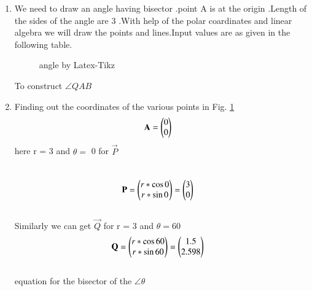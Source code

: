 \begin{enumerate}[label=\thesection.\arabic*.,ref=\thesection.\theenumi]
\item We need to draw  an angle having   bisector .point A is at the origin .Length of the  sides of the angle are 3 .With help of the polar coardinates and linear algebra we will draw the points and lines.Input values are as given in the following table.

\begin{figure}[!ht]
\centering
\resizebox{\columnwidth}{!}{}
\caption{ angle by Latex-Tikz}
\label{fig:angle}	
\end{figure}

\begin{table}[ht!]
\centering

\caption{To construct $\angle QAB$}
\label{table:table1}	
\end{table}


\item Finding out  the coordinates of the various points in Fig. \ref{fig:angle}
\label{const:angle}
\\
 
\begin{align}
\mathbf{A} &= \begin{pmatrix}0\\0\end{pmatrix}
\end{align}
here r = 3 and $\theta =$ 0 for  $\vec{P}$


\begin{align}
\\
\mathbf{P} &= \begin{pmatrix}r*\cos{0}\\r*\sin{0}\end{pmatrix} = \begin{pmatrix}3\\0\end{pmatrix}
\end{align}
\\

Similarly we can get $\vec{Q}$ for  r = 3 and $\theta = 60$
\\
\begin{align}
\mathbf{Q} &= \begin{pmatrix}r*\cos{60}\\r*\sin{60}\end{pmatrix} = \begin{pmatrix}1.5\\2.598\end{pmatrix}
\end{align}
\\
equation for the bisector of the $\angle{\theta}$
 

\end{enumerate}
